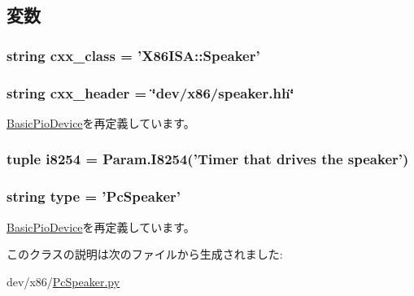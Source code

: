 \subsection{変数}
\hypertarget{classPcSpeaker_1_1PcSpeaker_a58cd55cd4023648e138237cfc0822ae3}{
\subsubsection[{cxx\_\-class}]{\setlength{\rightskip}{0pt plus 5cm}string {\bf cxx\_\-class} = '{\bf X86ISA::Speaker}'}}
\label{classPcSpeaker_1_1PcSpeaker_a58cd55cd4023648e138237cfc0822ae3}
\hypertarget{classPcSpeaker_1_1PcSpeaker_a17da7064bc5c518791f0c891eff05fda}{
\subsubsection[{cxx\_\-header}]{\setlength{\rightskip}{0pt plus 5cm}string {\bf cxx\_\-header} = \char`\"{}dev/x86/speaker.hh\char`\"{}}}
\label{classPcSpeaker_1_1PcSpeaker_a17da7064bc5c518791f0c891eff05fda}


\hyperlink{classDevice_1_1BasicPioDevice_a17da7064bc5c518791f0c891eff05fda}{BasicPioDevice}を再定義しています。\hypertarget{classPcSpeaker_1_1PcSpeaker_ac3df511be44044737575fbb8184ef982}{
\subsubsection[{i8254}]{\setlength{\rightskip}{0pt plus 5cm}tuple {\bf i8254} = Param.I8254('Timer that drives the speaker')}}
\label{classPcSpeaker_1_1PcSpeaker_ac3df511be44044737575fbb8184ef982}
\hypertarget{classPcSpeaker_1_1PcSpeaker_acce15679d830831b0bbe8ebc2a60b2ca}{
\subsubsection[{type}]{\setlength{\rightskip}{0pt plus 5cm}string {\bf type} = '{\bf PcSpeaker}'}}
\label{classPcSpeaker_1_1PcSpeaker_acce15679d830831b0bbe8ebc2a60b2ca}


\hyperlink{classDevice_1_1BasicPioDevice_acce15679d830831b0bbe8ebc2a60b2ca}{BasicPioDevice}を再定義しています。

このクラスの説明は次のファイルから生成されました:\begin{DoxyCompactItemize}
\item 
dev/x86/\hyperlink{PcSpeaker_8py}{PcSpeaker.py}\end{DoxyCompactItemize}
